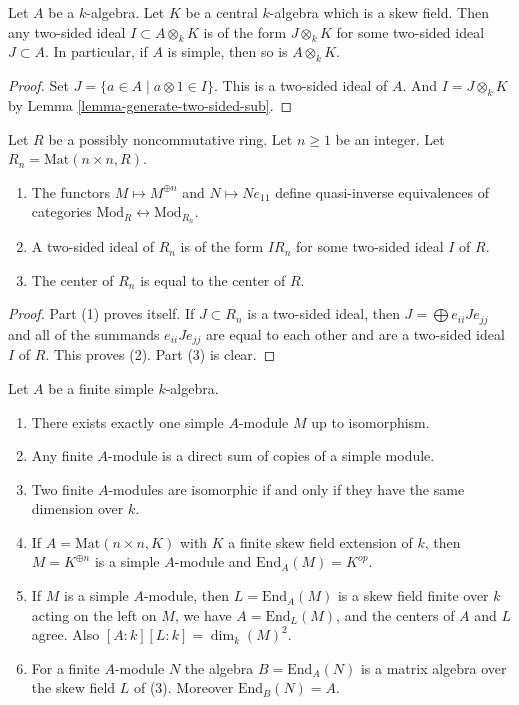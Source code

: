 \begin{lemma}
\label{lemma-generate-two-sided-ideal}
Let $A$ be a $k$-algebra. Let $K$ be a central $k$-algebra
which is a skew field. Then any two-sided ideal $I \subset A \otimes_k K$
is of the form $J \otimes_k K$ for some two-sided ideal $J \subset A$.
In particular, if $A$ is simple, then so is $A \otimes_k K$.
\end{lemma}

\begin{proof}
Set $J = \{a \in A \mid a \otimes 1 \in I\}$. This is a two-sided ideal
of $A$. And $I = J \otimes_k K$ by
Lemma \ref{lemma-generate-two-sided-sub}.
\end{proof}

\begin{lemma}
\label{lemma-matrix-algebras}
Let $R$ be a possibly noncommutative ring. Let $n \geq 1$ be an integer.
Let $R_n = \text{Mat}(n \times n, R)$.
\begin{enumerate}
\item The functors $M \mapsto M^{\oplus n}$ and
$N \mapsto Ne_{11}$ define quasi-inverse equivalences of categories
$\text{Mod}_R \leftrightarrow \text{Mod}_{R_n}$.
\item A two-sided ideal of $R_n$ is of the form $IR_n$ for some
two-sided ideal $I$ of $R$.
\item The center of $R_n$ is equal to the center of $R$.
\end{enumerate}
\end{lemma}

\begin{proof}
Part (1) proves itself. If $J \subset R_n$ is a two-sided ideal, then
$J = \bigoplus e_{ii}Je_{jj}$ and all of the summands $e_{ii}Je_{jj}$ are
equal to each other and are a two-sided ideal $I$ of $R$. This proves (2).
Part (3) is clear.
\end{proof}

\begin{lemma}
\label{lemma-simple-module-unique}
Let $A$ be a finite simple $k$-algebra.
\begin{enumerate}
\item There exists exactly one simple $A$-module $M$ up to isomorphism.
\item Any finite $A$-module is a direct sum of copies of a simple module.
\item Two finite $A$-modules are isomorphic if and only if they
have the same dimension over $k$.
\item If $A = \text{Mat}(n \times n, K)$ with $K$ a finite skew field
extension of $k$, then $M = K^{\oplus n}$ is a simple $A$-module and
$\text{End}_A(M) = K^{op}$.
\item If $M$ is a simple $A$-module, then $L = \text{End}_A(M)$
is a skew field finite over $k$ acting on the left on $M$, we have
$A = \text{End}_L(M)$, and the centers of $A$ and $L$ agree.
Also $[A : k] [L : k] = \dim_k(M)^2$.
\item For a finite $A$-module $N$ the algebra $B = \text{End}_A(N)$ is a
matrix algebra over the skew field $L$ of (3). Moreover $\text{End}_B(N) = A$.
\end{enumerate}
\end{lemma}

